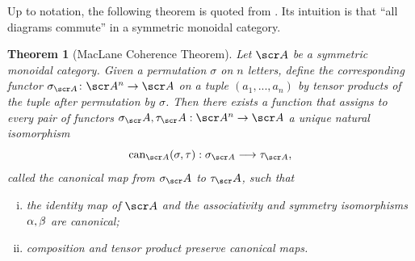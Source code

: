 \documentclass{amsart}
\newtheorem{thm}{Theorem}[section]
\theoremstyle{definition}
\numberwithin{equation}{section}
\begin{document}
Up to notation, the following theorem is quoted from \cite{Mac}.  Its intuition is that ``all diagrams commute'' in a symmetric monoidal category. 

\begin{thm}[MacLane Coherence Theorem]\label{SMCoh}
    Let $\sA$ be a symmetric monoidal category. Given a permutation $\sigma$ on $n$ letters, define the corresponding functor $\sigma_{\sA}\colon \sA^n\rightarrow\sA$ on a tuple $(a_1,...,a _n)$ by tensor products of the tuple after permutation by $\sigma$. Then there exists a function that assigns to every pair of functors $\sigma_\sA , \tau_\sA : \sA ^n\rightarrow\sA $ a unique natural isomorphism
\[
\mathrm{can}_{\sA }(\sigma, \tau) : \sigma_{\sA } \longrightarrow \tau_{\sA },
\]
called the \emph{canonical map} from $\sigma_\sA $ to $\tau_\sA $, such that
\begin{enumerate}[(i)]
    \item the identity map of $\sA $ and the associativity and symmetry isomorphisms $\alpha, \beta$ are canonical;
    \item composition and tensor product preserve canonical maps.
\end{enumerate}
\end{thm}


\end{document}

